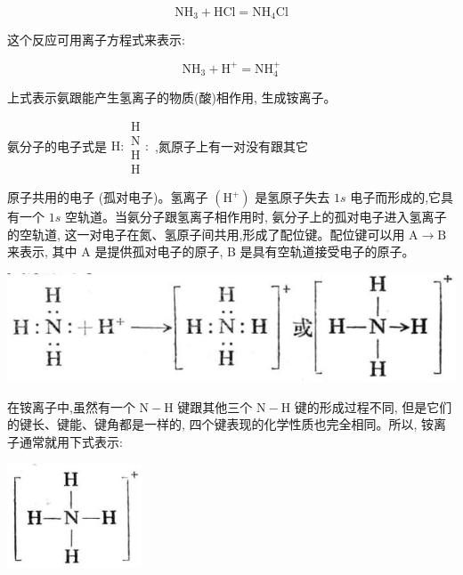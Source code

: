 \documentclass[10pt]{article}
\begin{document}
\[
{\mathrm{{NH}}}_{3} + \mathrm{{HCl}} = {\mathrm{{NH}}}_{4}\mathrm{{Cl}}
\]

这个反应可用离子方程式来表示:

\[
{\mathrm{{NH}}}_{3} + {\mathrm{H}}^{ + } = {\mathrm{{NH}}}_{4}^{ + }
\]

上式表示氨跟能产生氢离子的物质(酸)相作用, 生成铵离子。

氨分子的电子式是 \(\mathrm{H} : \begin{matrix} \mathrm{H} \\ \mathrm{N} \\ \mathrm{H} \\ \mathrm{H} \end{matrix} :\) ,氮原子上有一对没有跟其它

原子共用的电子 (孤对电子)。氢离子 \(\left( {\mathrm{H}}^{ + }\right)\) 是氢原子失去 \({1s}\) 电子而形成的,它具有一个 \({1s}\) 空轨道。当氨分子跟氢离子相作用时, 氨分子上的孤对电子进入氢离子的空轨道, 这一对电子在氮、氢原子间共用,形成了配位键。配位键可以用 \(\mathrm{A} \rightarrow \mathrm{B}\) 来表示, 其中 A 是提供孤对电子的原子, B 是具有空轨道接受电子的原子。

\begin{center}
\includegraphics[max width=1.0\textwidth]{images/01912d13-9986-7822-a012-3f3f7be99dcb_17_176417.jpg}
\end{center}

在铵离子中,虽然有一个 \(\mathrm{N} - \mathrm{H}\) 键跟其他三个 \(\mathrm{N} - \mathrm{H}\) 键的形成过程不同, 但是它们的键长、键能、键角都是一样的, 四个键表现的化学性质也完全相同。所以, 铵离子通常就用下式表示:

\begin{center}
\includegraphics[max width=0.3\textwidth]{images/01912d13-9986-7822-a012-3f3f7be99dcb_17_186848.jpg}
\end{center}
\end{document}
